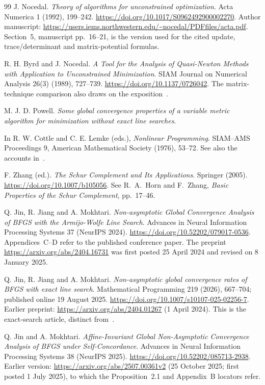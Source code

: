 \begin{thebibliography}{99}
J. Nocedal. \emph{Theory of algorithms for unconstrained optimization}. Acta Numerica 1 (1992), 199--242. \url{https://doi.org/10.1017/S0962492900002270}. Author manuscript: \url{https://users.iems.northwestern.edu/~nocedal/PDFfiles/acta.pdf}. Section~5, manuscript pp.~16--21, is the version used for the cited update, trace/determinant and matrix-potential formulas.

R. H. Byrd and J. Nocedal. \emph{A Tool for the Analysis of Quasi-Newton Methods with Application to Unconstrained Minimization}. SIAM Journal on Numerical Analysis 26(3) (1989), 727--739. \url{https://doi.org/10.1137/0726042}. The matrix-technique comparison also draws on the exposition~\cite{FND_N92}.

M. J. D. Powell. \emph{Some global convergence properties of a variable metric algorithm for minimization without exact line searches}.\par
In R. W. Cottle and C. E. Lemke (eds.), \emph{Nonlinear Programming}. SIAM--AMS Proceedings 9, American Mathematical Society (1976), 53--72. See also the accounts in~\cite{FND_BN89,FND_N92,GL18}.

F. Zhang (ed.). \emph{The Schur Complement and Its Applications}. Springer (2005). \url{https://doi.org/10.1007/b105056}. See R.~A.~Horn and F.~Zhang, \emph{Basic Properties of the Schur Complement}, pp.~17--46.

Q. Jin, R. Jiang and A. Mokhtari. \emph{Non-asymptotic Global Convergence Analysis of BFGS with the Armijo-Wolfe Line Search}. Advances in Neural Information Processing Systems 37 (NeurIPS 2024). \url{https://doi.org/10.52202/079017-0536}. Appendices~C--D refer to the published conference paper. The preprint \url{https://arxiv.org/abs/2404.16731} was first posted 25 April 2024 and revised on 8 January 2025.

Q. Jin, R. Jiang and A. Mokhtari. \emph{Non-asymptotic global convergence rates of BFGS with exact line search}. Mathematical Programming 219 (2026), 667--704; published online 19 August 2025. \url{https://doi.org/10.1007/s10107-025-02256-7}. Earlier preprint: \url{https://arxiv.org/abs/2404.01267} (1 April 2024). This is the exact-search article, distinct from~\cite{FND_JJM24AW}.

Q. Jin and A. Mokhtari. \emph{Affine-Invariant Global Non-Asymptotic Convergence Analysis of BFGS under Self-Concordance}. Advances in Neural Information Processing Systems 38 (NeurIPS 2025). \url{https://doi.org/10.52202/085713-2938}. Earlier version: \url{https://arxiv.org/abs/2507.00361v2} (25 October 2025; first posted 1 July 2025), to which the Proposition~2.1 and Appendix~B locators refer.


\end{thebibliography}
